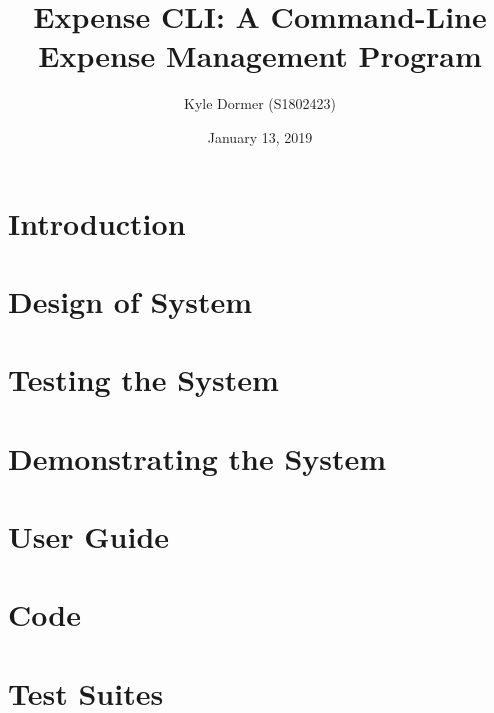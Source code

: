 \documentclass[12pt]{article}
\title{Expense CLI: A Command-Line Expense Management Program}
\author{Kyle Dormer (S1802423)}
\date{January 13, 2019}
\begin{document}
  \maketitle
  \tableofcontents
  \newpage

  \section{Introduction}
  \section{Design of System}
  \section{Testing the System}
  \section{Demonstrating the System}

  \appendix
  \section{User Guide}
  \section{Code}
  \section{Test Suites}
\end{document}
